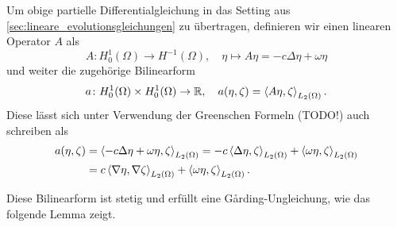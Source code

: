 Um obige partielle Differentialgleichung in das Setting aus \autoref{sec:lineare_evolutionsgleichungen} zu übertragen, definieren wir einen linearen Operator $A$ als
\begin{equation}
    \label{eq:def_op_A}
    A \colon H^{1}_{0}(\Omega) \to H^{-1}(\Omega), \quad \eta \mapsto A \eta = - c \Delta \eta + \omega \eta
\end{equation}
und weiter die zugehörige Bilinearform
\begin{equation}
    a \colon H^{1}_{0}(\Omega) \times H^{1}_{0}(\Omega) \to \mathbb{R}, \quad a(\eta, \zeta) = \left\langle A \eta,\zeta\right\rangle_{L_{2}(\Omega)}.
\end{equation}
Diese lässt sich unter Verwendung der Greenschen Formeln (TODO!) auch schreiben als
\begin{equation}
    \begin{aligned}
        a(\eta, \zeta)
        &= \left\langle- c \Delta \eta + \omega \eta,\zeta\right\rangle_{L_{2}(\Omega)}
        = - c \left\langle\Delta \eta,\zeta\right\rangle_{L_{2}(\Omega)} + \left\langle\omega \eta,\zeta\right\rangle_{L_{2}(\Omega)}
        \\&= c \left\langle\nabla \eta,\nabla \zeta\right\rangle_{L_{2}(\Omega)} + \left\langle\omega \eta,\zeta\right\rangle_{L_{2}(\Omega)}.
    \end{aligned}
\end{equation}

Diese Bilinearform ist stetig und erfüllt eine G\aa{}rding-Ungleichung, wie das folgende Lemma zeigt.

